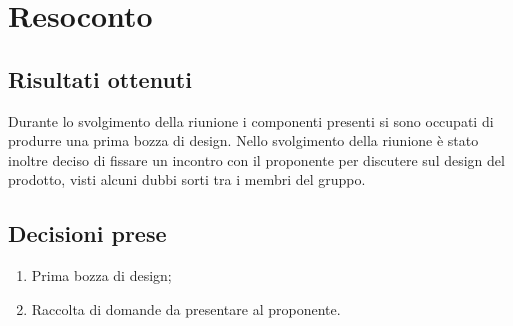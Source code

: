 \section{Resoconto}

\subsection{Risultati ottenuti}

Durante lo svolgimento della riunione i componenti presenti si sono occupati di produrre una prima bozza di design. Nello svolgimento della riunione è stato inoltre deciso di fissare un incontro con il proponente per discutere sul design del prodotto, visti alcuni dubbi sorti tra i membri del gruppo.


\subsection{Decisioni prese}

\begin{enumerate}
    \item Prima bozza di design;
    \item Raccolta di domande da presentare al proponente.
\end{enumerate}